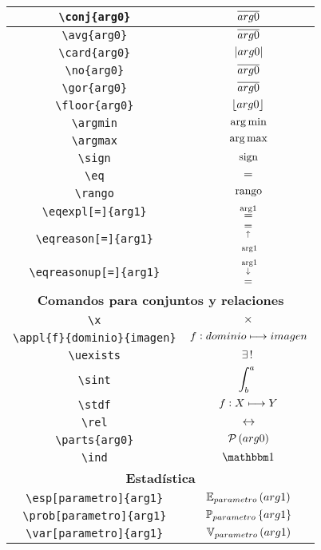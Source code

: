 \begin{longtable}{|c|c|}
\verb|\conj{arg0}| & $\displaystyle\overline{arg0}$ \\ \hline 
\verb|\avg{arg0}| & $\displaystyle\overline{arg0}$ \\ \hline 
\verb|\card{arg0}| & $\displaystyle\left\vert arg0 \right\vert$ \\ \hline 
\verb|\no{arg0}| & $\displaystyle\overline{arg0}$ \\ \hline 
\verb|\gor{arg0}| & $\displaystyle\overline{arg0}$ \\ \hline 
\verb|\floor{arg0}| & $\displaystyle\left\lfloor arg0 \right\rfloor$ \\ \hline 
\verb|\argmin| & $\displaystyle\operatorname*{arg\,min}$ \\ \hline 
\verb|\argmax| & $\displaystyle\operatorname*{arg\,max}$ \\ \hline 
\verb|\sign| & $\displaystyle\operatorname{sign}$ \\ \hline 
\verb|\eq| & $\displaystyle=$ \\ \hline 
\verb|\rango| & $\displaystyle\operatorname{rango}$ \\ \hline 
\verb|\eqexpl[=]{arg1}| & $\displaystyle\eqexpl[=]{arg1}$ \\ \hline 
\verb|\eqreason[=]{arg1}| & $\displaystyle\eqreason[=]{arg1}$ \\ \hline 
\verb|\eqreasonup[=]{arg1}| & $\displaystyle\eqreasonup[=]{arg1}$ \\ \hline 
\multicolumn{2}{|c|}{\textbf{Comandos para conjuntos y relaciones}} \\ \hline 
\verb|\x| & $\displaystyle\times$ \\ \hline 
\verb|\appl{f}{dominio}{imagen}| & $\displaystyle f : dominio\longmapsto imagen$ \\ \hline 
\verb|\uexists| & $\displaystyle\exists\, !\;$ \\ \hline 
\verb|\sint| & $\displaystyle\int_b^a\;$ \\ \hline 
\verb|\stdf| & $\displaystyle f : X\longmapsto Y$ \\ \hline 
\verb|\rel| & $\displaystyle\rel$ \\ \hline 
\verb|\parts{arg0}| & $\displaystyle\mathcal{P}\left(arg0\right)$ \\ \hline 
\verb|\ind| & $\displaystyle\ind$ \\ \hline 
\multicolumn{2}{|c|}{\textbf{Estadística}} \\ \hline 
\verb|\esp[parametro]{arg1}| & $\displaystyle\esp[parametro]{arg1}$ \\ \hline 
\verb|\prob[parametro]{arg1}| & $\displaystyle\prob[parametro]{arg1}$ \\ \hline 
\verb|\var[parametro]{arg1}| & $\displaystyle\var[parametro]{arg1}$ \\ \hline 

\end{longtable}
